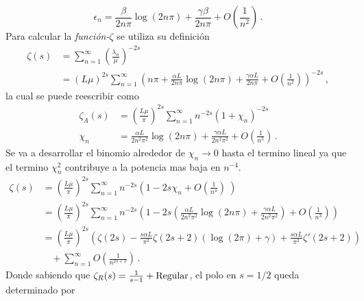 \begin{equation}\label{anterior}
    \epsilon _n =  \frac{\beta }{2 n \pi} \log (2 n \pi) +
                \frac{\gamma \beta}{2 n \pi} +
                O\left(  \frac{1}{n^2} \right)
                	\, .
\end{equation}
Para calcular la {\it función-$\zeta $} se utiliza su definición
\begin{equation}
\begin{aligned}
    \zeta (s) &= \sum _{n=1} ^{\infty} \left( \frac{\lambda _n}{\mu} \right) ^{-2 s}  \\
    & =    ( L \mu ) ^{2 s} \sum _{n=1} ^{\infty} 
    \left( 
    n \pi + \frac{\alpha L }{2 n \pi} \log (2 n \pi) + \frac{\gamma \alpha L}{2 n \pi} +
    O \left( \frac{1}{n^2} \right)
    \right) ^{-2s}
    	\, ,
\end{aligned}
\end{equation}
la cual se puede reescribir como
\begin{equation}
\begin{aligned}
    \zeta _A (s) &= \left( \frac{L \mu }{\pi} \right)  ^{2 s} 
    \sum _{n=1} ^{\infty} n ^{- 2  s} 
    \left(
    	1 + \chi _n 
    	\right) ^{-2 s} \\[5pt]
		 \chi _n &= 
    	\frac{\alpha L  }{2 n^2 \pi ^2} \log (2 n \pi) + 
    	\frac{\gamma \alpha L}{2 n^2 \pi ^2 } +
    	O \left(
    		\frac{1}{n^3} \right) 
    			\, .
\end{aligned}
\end{equation}
Se va a desarrollar el binomio alrededor de  $\chi _n \rightarrow 0$ hasta el termino lineal ya que el termino $\chi _n ^2 $ contribuye a la potencia mas baja en $n ^{-4} $. 
\begin{align}\label{eq.zeta.c}
    \zeta  (s) &= \left( \frac{L \mu}{\pi} \right) ^{2 s}
    \sum _{n=1} ^{\infty} 
    n ^{-2s}
    \left(
    1 - 2 s \chi _n + O \left( \frac{1}{n ^4} \right) \
    \right)   \nonumber \\[5pt]
     &= \left( \frac{L \mu }{\pi} \right) ^{2 s}
    \sum _{n=1} ^{\infty} n ^{-2 s} 
    \left(
    1 - 2s \left(
    \frac{\alpha L }{2 n ^2 \pi ^2} \log ( 2  n \pi) + 
    \frac{\gamma \alpha L }{2 n ^2 \pi ^2} 
	\right) +
    O \left( \frac{1}{n ^{3} }  \right)
    \right) \nonumber \\[5pt]
    &=   \left( \frac{L \mu }{ \pi } \right) ^{2 s}  
    \left( \zeta (2 s) -
	\frac{ s \alpha L}{ \pi ^2} \zeta (2s+2)
	\left(
	    \log (2  \pi ) + \gamma
	\right) + 
    \frac{s \alpha L}{\pi ^2}
	\zeta '(2s+2) \right) \nonumber \\[5pt]
	&\ \ \ \  + \sum _{n=1} ^{\infty} O \left( \frac{1}{n ^{2s+3}} \right) \, .
\end{align}    
Donde sabiendo que $\zeta _R (s) = \frac{1}{s-1} + {\rm Regular} $, el polo en $s=1/2$ queda determinado por

